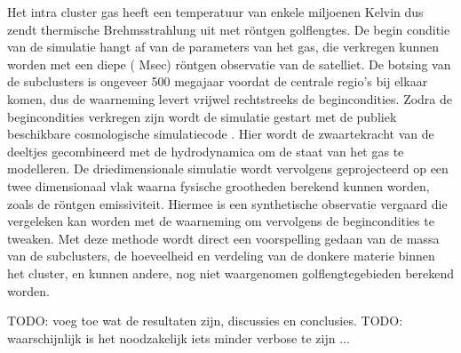 \documentclass[MScProj_TLRH_ClusterEnergy.tex]{subfiles}
\begin{document}
Het intra cluster gas heeft een temperatuur van enkele miljoenen Kelvin dus
zendt thermische Brehmsstrahlung uit met r\"ontgen golflengtes. De begin
conditie van de simulatie hangt af van de parameters van het gas, die verkregen
kunnen worden met een diepe ( Msec) r\"ontgen observatie van de
 satelliet. De botsing van de subclusters is ongeveer 500
megajaar voordat de centrale regio's bij elkaar komen, dus de waarneming levert
vrijwel rechtstreeks de begincondities. Zodra de begincondities verkregen zijn
wordt de simulatie gestart met de publiek beschikbare cosmologische
simulatiecode . Hier wordt de zwaartekracht van de deeltjes
gecombineerd met de hydrodynamica om de staat van het gas te modelleren. De
driedimensionale simulatie wordt vervolgens geprojecteerd op een twee
dimensionaal vlak waarna fysische grootheden berekend kunnen worden, zoals de
r\"ontgen emissiviteit. Hiermee is een synthetische observatie vergaard die
vergeleken kan worden met de  waarneming om vervolgens de
begincondities te tweaken. Met deze methode wordt direct een voorspelling gedaan
van de massa van de subclusters, de hoeveelheid en verdeling van de donkere
materie binnen het cluster, en kunnen andere, nog niet waargenomen
golflengtegebieden berekend worden.


TODO: voeg toe wat de resultaten zijn, discussies en conclusies.
TODO: waarschijnlijk is het noodzakelijk iets minder verbose te zijn ...


\end{document}
